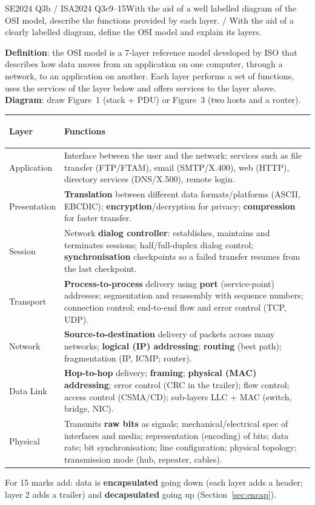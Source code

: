 \documentclass[10pt]{article}
\begin{document}
\begin{pastq}{SE2024 Q3b \textnormal{/} ISA2024 Q3c}{9--15}With the aid of a well labelled diagram of the OSI model, describe the functions provided by each layer. / With the aid of a clearly labelled diagram, define the OSI model and explain its layers.\end{pastq}
\begin{ans}
\textbf{Definition}: the OSI model is a 7-layer reference model developed by ISO that describes how data moves from an application on one computer, through a network, to an application on another. Each layer performs a set of functions, uses the services of the layer below and offers services to the layer above. \textbf{Diagram}: draw Figure~1 (stack + PDU) or Figure~3 (two hosts and a router).

\small
\begin{tabularx}{\linewidth}{@{}>{\bfseries\raggedright\arraybackslash}p{1.9cm}X@{}}
\toprule
Layer & Functions\\\midrule
7 Application & Interface between the user and the network; services such as file transfer (FTP/FTAM), email (SMTP/X.400), web (HTTP), directory services (DNS/X.500), remote login.\\
6 Presentation & \textbf{Translation} between different data formats/platforms (ASCII, EBCDIC); \textbf{encryption}/decryption for privacy; \textbf{compression} for faster transfer.\\
5 Session & Network \textbf{dialog controller}: establishes, maintains and terminates sessions; half/full-duplex dialog control; \textbf{synchronisation} checkpoints so a failed transfer resumes from the last checkpoint.\\
4 Transport & \textbf{Process-to-process} delivery using \textbf{port} (service-point) addresses; segmentation and reassembly with sequence numbers; connection control; end-to-end flow and error control (TCP, UDP).\\
3 Network & \textbf{Source-to-destination} delivery of packets across many networks; \textbf{logical (IP) addressing}; \textbf{routing} (best path); fragmentation (IP, ICMP; router).\\
2 Data Link & \textbf{Hop-to-hop} delivery; \textbf{framing}; \textbf{physical (MAC) addressing}; error control (CRC in the trailer); flow control; access control (CSMA/CD); sub-layers LLC + MAC (switch, bridge, NIC).\\
1 Physical & Transmits \textbf{raw bits} as signals; mechanical/electrical spec of interfaces and media; representation (encoding) of bits; data rate; bit synchronisation; line configuration; physical topology; transmission mode (hub, repeater, cables).\\
\bottomrule
\end{tabularx}
\normalsize
For 15 marks add: data is \textbf{encapsulated} going down (each layer adds a header; layer 2 adds a trailer) and \textbf{decapsulated} going up (Section~\ref{sec:encap}).
\end{ans}
\end{document}
